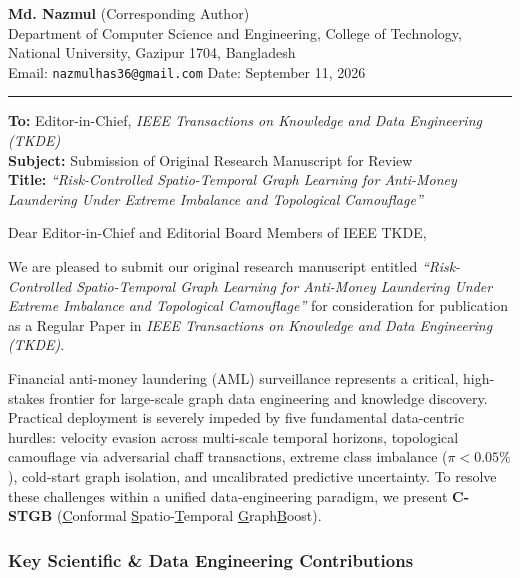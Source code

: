 \documentclass[9.3pt,a4paper]{article}
\begin{document}
\noindent
\textbf{Md. Nazmul} (Corresponding Author) \\
Department of Computer Science and Engineering, College of Technology, National University, Gazipur 1704, Bangladesh \\
Email: \texttt{nazmulhas36@gmail.com} \hfill Date: September 11, 2026

\vspace{0.08cm}
\hrule
\vspace{0.10cm}

\noindent
\textbf{To:} Editor-in-Chief, \textit{IEEE Transactions on Knowledge and Data Engineering (TKDE)} \\
\textbf{Subject:} Submission of Original Research Manuscript for Review \\
\textbf{Title:} \textit{``Risk-Controlled Spatio-Temporal Graph Learning for Anti-Money Laundering Under Extreme Imbalance and Topological Camouflage''}

\vspace{0.12cm}

\noindent
Dear Editor-in-Chief and Editorial Board Members of IEEE TKDE,

\noindent
We are pleased to submit our original research manuscript entitled \textit{``Risk-Controlled Spatio-Temporal Graph Learning for Anti-Money Laundering Under Extreme Imbalance and Topological Camouflage''} for consideration for publication as a Regular Paper in \textit{IEEE Transactions on Knowledge and Data Engineering (TKDE)}.

Financial anti-money laundering (AML) surveillance represents a critical, high-stakes frontier for large-scale graph data engineering and knowledge discovery. Practical deployment is severely impeded by five fundamental data-centric hurdles: velocity evasion across multi-scale temporal horizons, topological camouflage via adversarial chaff transactions, extreme class imbalance ($\pi < 0.05\%$), cold-start graph isolation, and uncalibrated predictive uncertainty. To resolve these challenges within a unified data-engineering paradigm, we present \textbf{C-STGB} (\underline{C}onformal \underline{S}patio-\underline{T}emporal \underline{G}raph\underline{B}oost).

\subsubsection*{Key Scientific \& Data Engineering Contributions}
\end{document}
